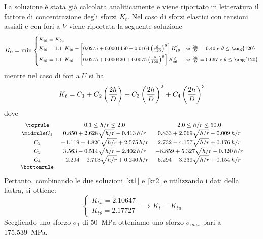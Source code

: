 La soluzione è stata già calcolata analiticamente e viene riportato in letteratura il fattore di concentrazione degli sforzi $K_t$.
Nel caso di sforzi elastici con tensioni assiali e con fori a $V$ viene riportata la seguente soluzione
\begin{equation}\footnotesize\label{kt1}
K_0=\min
\begin{cases}
K_{t\theta}=K_{tu} & \\
K_{t\theta} = 1.11 K_{t\theta} - \left[0.0275 + 0.0001450 + 0.0164\left(\frac{\theta}{120}\right)^8\right]K_{t\theta}^2 & \text{se $\frac{2h}{D} = 0.40$ e $\theta\le \ang{120}$}\\
K_{t\theta} = 1.11 K_{t\theta} - \left[0.0275 + 0.000420 + 0.0075\left(\frac{\theta}{120}\right)^8\right]K_{t\theta}^2 & \text{se $\frac{2h}{D} = 0.667$ e $\theta\le \ang{120}$}
\end{cases}
\end{equation} 
mentre nel caso di fori a $U$ si ha
\begin{equation}\footnotesize\label{kt2}
K_t = C_1 + C_2\left(\frac{2h}{D}\right) + C_3\left(\frac{2h}{D}\right)^2 + C_4\left(\frac{2h}{D}\right)^3
\end{equation} 
dove 
\[ \footnotesize
\begin{array}{ccc}
\toprule
 & 0.1\le h/r\le 2.0 & 2.0\le h/r\le 50.0 \\ \midrule
C_1 & 0.850+2.628\sqrt{h/r}-0.413\,h/r & 0.833+2.069\sqrt{h/r}-0.009\,h/r \\ 
C_2 & -1.119-4.826\sqrt{h/r}+2.575\,h/r & 2.732-4.157\sqrt{h/r}+0.176\,h/r \\  
C_3 & 3.563-0.514\sqrt{h/r}-2.402\,h/r & -8.859+5.327\sqrt{h/r}-0.320\,h/r \\  
C_4 & -2.294 + 2.713\sqrt{h/r}+0.240\,h/r & 6.294-3.239\sqrt{h/r}+0.154\,h/r \\  \bottomrule
\end{array}
\]
Pertanto, combinando le due soluzioni \eqref{kt1} e \eqref{kt2} e utilizzando i dati della lastra, si ottiene:
\[
\begin{cases}
K_{tu}=2.10647\\
K_{t\theta}=2.17727
\end{cases} \implies K_t = K_{tu}
\]
Scegliendo uno sforzo $\sigma_1$ di \SI{50}{\mega\pascal} otteniamo uno sforzo $\sigma_{max}$ pari a \SI{175.539}{\mega\pascal}.
